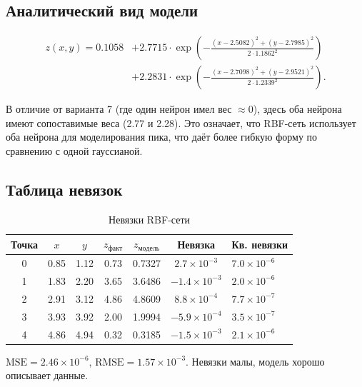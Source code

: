 \subsection{Аналитический вид модели}

\begin{equation}\label{eq:rbf_result}
    \begin{aligned}
        z(x,y) = 0.1058 &+ 2.7715 \cdot \exp\left(-\frac{(x - 2.5082)^2 + (y - 2.7985)^2}{2 \cdot 1.1862^2}\right) \\
                         &+ 2.2831 \cdot \exp\left(-\frac{(x - 2.7098)^2 + (y - 2.9521)^2}{2 \cdot 1.2339^2}\right).
    \end{aligned}
\end{equation}

В отличие от варианта 7 (где один нейрон имел вес $\approx 0$), здесь оба нейрона имеют сопоставимые веса (2.77 и 2.28). Это означает, что RBF-сеть использует оба нейрона для моделирования пика, что даёт более гибкую форму по сравнению с одной гауссианой.

\subsection{Таблица невязок}

\begin{table}[H]
    \centering
    \caption{Невязки RBF-сети}
    \label{tab:rbf_residuals}
    \begin{tabular}{|c|c|c|c|c|c|}
        \hline
        \textbf{Точка} & \textbf{$x$} & \textbf{$y$} & \textbf{$z_{факт}$} & \textbf{$z_{модель}$} & \textbf{Невязка} & \textbf{Кв. невязки} \\
         & 0.85 & 1.12 & 0.73 & 0.7327 & $2.7 \times 10^{-3}$ & $7.0 \times 10^{-6}$ \\
        1 & 1.83 & 2.20 & 3.65 & 3.6486 & $-1.4 \times 10^{-3}$ & $2.0 \times 10^{-6}$ \\
        2 & 2.91 & 3.12 & 4.86 & 4.8609 & $8.8 \times 10^{-4}$ & $7.7 \times 10^{-7}$ \\
        3 & 3.93 & 3.92 & 2.00 & 1.9994 & $-5.9 \times 10^{-4}$ & $3.5 \times 10^{-7}$ \\
        4 & 4.86 & 4.94 & 0.32 & 0.3185 & $-1.5 \times 10^{-3}$ & $2.1 \times 10^{-6}$ \\
        \hline
    \end{tabular}
\end{table}

$\text{MSE} = 2.46 \times 10^{-6}$, $\text{RMSE} = 1.57 \times 10^{-3}$. Невязки малы, модель хорошо описывает данные.

